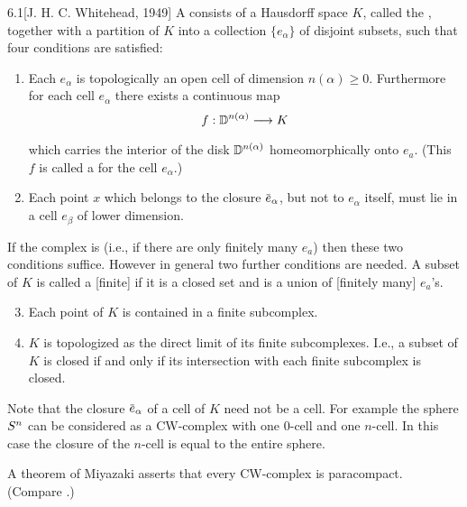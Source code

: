 \documentclass[../main]{subfiles}
\begin{document}
\begin{customdef}{6.1}[J. H. C. Whitehead, 1949]
\label{def:06.01}
A  consists of a Hausdorff space $K$, called the , together with a partition of $K$ into a collection $\{e_{\alpha}\}$ of disjoint subsets, such that four conditions are satisfied:
\begin{enumerate}[label=\arabic*)]
	\item Each $e_{\alpha}$ is topologically an open cell of dimension $n(\alpha) \geq 0$. Furthermore for each cell $e_{\alpha}$ there exists a continuous map
    \[
    f:{\disk^{n(\alpha)}}\varrightarrow{} K
    \]
    which carries the interior of the disk $\mathbb{D}^{n(\alpha)}$ homeomorphically onto $e_{a}$. (This $f$ is called a  for the cell $e_{\alpha}$.)
    \item Each point $x$ which belongs to the closure $\xoverline{e}_{\alpha}$, but not to $e_{\alpha}$ itself, must lie in a cell $e_\beta$ of lower dimension.
\end{enumerate}
If the complex is  (i.e., if there are only finitely many $e_{a}$) then these two conditions suffice. However in general two further conditions are needed. A subset of $K$ is called a [finite]  if it is a closed set and is a union of [finitely many] $e_{a}$'s.
\begin{enumerate}[label=\arabic*)]
	\setcounter{enumi}{2}
	\item {} Each point of $K$ is contained in a finite subcomplex.
	\item {} $K$ is topologized as the direct limit of its finite subcomplexes. I.e., a subset of $K$ is closed if and only if its intersection with each finite subcomplex is closed.
\end{enumerate}
\end{customdef}
Note that the closure $\xoverline{e}_{\alpha}$ of a cell of $K$ need not be a cell. For example the sphere $S^{n}$ can be considered as a CW-complex with one $0$-cell and one $n$-cell. In this case the closure of the $n$-cell is equal to the entire sphere.

A theorem of Miyazaki \cite{miyazaki1952} asserts that every CW-complex is paracompact. (Compare \cite[p.~419]{dugundji1966}.)
\end{document}
